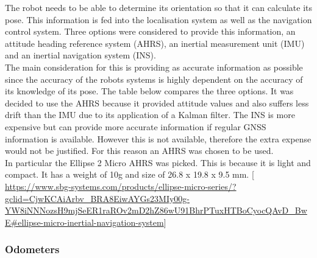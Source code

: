 \documentclass[11pt]{article}		%
\begin{document}
            The robot needs to be able to determine its orientation so that it can calculate its pose. 
            This information is fed into the localisation system as well as the navigation control system. 
            Three options were considered to provide this information, an attitude heading reference system (AHRS), an inertial measurement unit (IMU) and an inertial navigation system (INS). 
            \\
            The main consideration for this is providing as accurate information as possible since the accuracy of the robots systems is highly dependent on the accuracy of its knowledge of its pose.
            The table below compares the three options.
            It was decided to use the AHRS because it provided attitude values and also suffers less drift than the IMU due to its application of a Kalman filter. 
            The INS is more expensive but can provide more accurate information if regular GNSS information is available. 
            However this is not available, therefore the extra expense would not be justified. For this reason an AHRS was chosen to be used.
            \\
            In particular the Ellipse 2 Micro AHRS was picked.
            This is because it is light and compact. It has a weight of 10g and size of 26.8 x 19.8 x 9.5 mm. [ \url{https://www.sbg-systems.com/products/ellipse-micro-series/?gclid=CjwKCAiArbv_BRA8EiwAYGs23MIy00g-YW8iNNNozsH9mjSeER1raROv2mD2hZ86wU91BhrPTuxHTBoCyocQAvD_BwE#ellipse-micro-inertial-navigation-system}]
            


        \subsubsection{Odometers}
        
\end{document}
